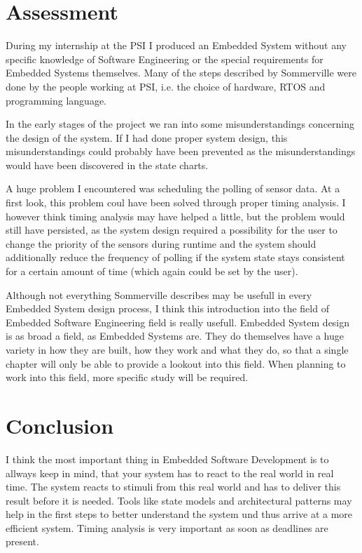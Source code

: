 \documentclass[10pt,a4paper,titlepage,draft]{article} %
\begin{document}
\section{Assessment}
During my internship at the PSI I produced an Embedded System without any specific knowledge of Software Engineering or the special requirements for Embedded Systems themselves.
Many of the steps described by Sommerville were done by the people working at PSI, i.e. the choice of hardware, RTOS and programming language.

In the early stages of the project we ran into some misunderstandings concerning the design of the system. If I had done proper system design, this misunderstandings could probably have been prevented as the misunderstandings would have been discovered in the state charts.

A huge problem I encountered was scheduling the polling of sensor data.
At a first look, this problem coul have been solved through proper timing analysis.
I however think timing analysis may have helped a little, but the problem would still have persisted, as the system design required a possibility for the user to change the priority of the sensors during runtime and the system should additionally reduce the frequency of polling if the system state stays consistent for a certain amount of time (which again could be set by the user).

Although not everything Sommerville describes may be usefull in every Embedded System design process, I think this introduction into the field of Embedded Software Engineering field is really usefull.
Embedded System design is as broad a field, as Embedded Systems are.
They do themselves have a huge variety in how they are built, how they work and what they do, so that a single chapter will only be able to provide a lookout into this field.
When planning to work into this field, more specific study will be required.

\section{Conclusion}
I think the most important thing in Embedded Software Development is to allways keep in mind, that your system has to react to the real world in real time. The system reacts to stimuli from this real world and has to deliver this result before it is needed. Tools like state models and architectural patterns may help in the first steps to better understand the system und thus arrive at a more efficient system. Timing analysis is very important as soon as deadlines are present.
\end{document}
